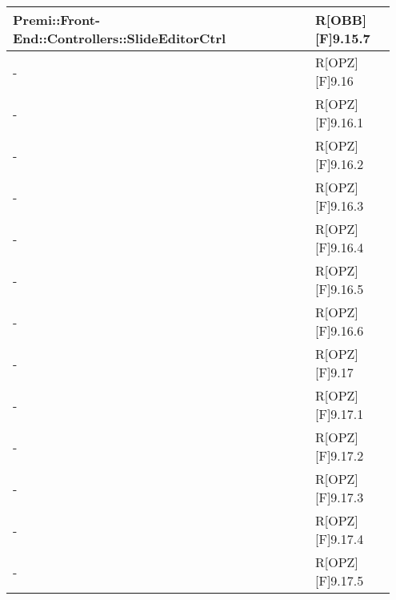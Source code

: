 \begin{table}[h]
\begin{center}
\begin{tabular}{|p{0.75\linewidth}|p{0.2\linewidth}|}
			Premi::Front-End::Controllers::SlideEditorCtrl & R[OBB][F]9.15.7 \\
		\midrule
			- & R[OPZ][F]9.16 \\
		\midrule
			- & R[OPZ][F]9.16.1 \\
		\midrule
			- & R[OPZ][F]9.16.2 \\
		\midrule
			- & R[OPZ][F]9.16.3 \\
		\midrule
			- & R[OPZ][F]9.16.4 \\
		\midrule
			- & R[OPZ][F]9.16.5 \\
		\midrule
			- & R[OPZ][F]9.16.6 \\
		\midrule
			- & R[OPZ][F]9.17 \\
		\midrule
			- & R[OPZ][F]9.17.1 \\
		\midrule
			- & R[OPZ][F]9.17.2 \\
		\midrule
			- & R[OPZ][F]9.17.3 \\
		\midrule
			- & R[OPZ][F]9.17.4 \\
		\midrule
			- & R[OPZ][F]9.17.5 \\
		\bottomrule
		\end{tabular}
	\end{center}
\end{table}



